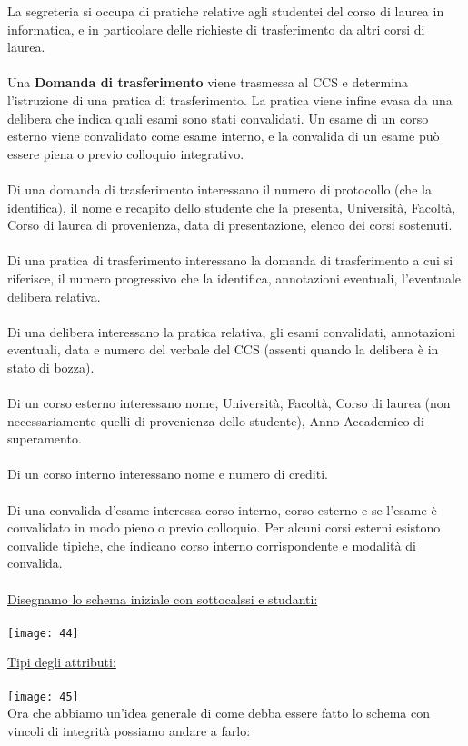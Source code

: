 \documentclass[12pt, letterpaper]{article}
\begin{document}
La segreteria si occupa di pratiche relative agli studentei del corso di laurea 
in informatica, e in particolare delle richieste di trasferimento da altri corsi di laurea.
\\
\\
Una \textbf{Domanda di trasferimento} viene trasmessa al CCS e determina l’istruzione di
una pratica di trasferimento. La pratica viene infine evasa da una delibera che
indica quali esami sono stati convalidati. Un esame di un corso esterno viene
convalidato come esame interno, e la convalida di un esame può essere piena o
previo colloquio integrativo.
\\
\\
Di una domanda di trasferimento interessano il numero di protocollo (che la
identifica), il nome e recapito dello studente che la presenta, Università, Facoltà,
Corso di laurea di provenienza, data di presentazione, elenco dei corsi sostenuti.
\\
\\
Di una pratica di trasferimento interessano la domanda di trasferimento a cui si
riferisce, il numero progressivo che la identifica, annotazioni eventuali, l’eventuale
delibera relativa.
\\
\\
Di una delibera interessano la pratica relativa, gli esami convalidati, annotazioni
eventuali, data e numero del verbale del CCS (assenti quando la delibera è in stato
di bozza).
\\
\\
Di un corso esterno interessano nome, Università, Facoltà, Corso di laurea (non
necessariamente quelli di provenienza dello studente), Anno Accademico di
superamento.
\\
\\
Di un corso interno interessano nome e numero di crediti.
\\
\\
Di una convalida d’esame interessa corso interno, corso esterno e se l’esame è
convalidato in modo pieno o previo colloquio.
Per alcuni corsi esterni esistono convalide tipiche, che indicano corso interno
corrispondente e modalità di convalida.
\\
\\
\underline{Disegnamo lo schema iniziale con sottocalssi e studanti:}
\\
\\
\texttt{[image: 44]}

\newpage

\underline{Tipi degli attributi:}
\\
\\
\texttt{[image: 45]}
\\
Ora che abbiamo un'idea generale di come debba essere fatto lo schema con vincoli 
di integrità possiamo andare a farlo:
\end{document}
